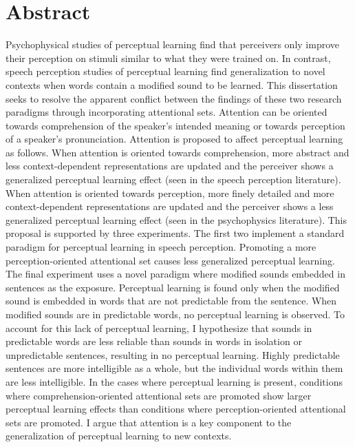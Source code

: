
\chapter{Abstract}

Psychophysical studies of perceptual learning find that perceivers only improve their perception on stimuli similar to what they were trained on.
In contrast, speech perception studies of perceptual learning find generalization to novel contexts when words contain a modified sound to be learned.
This dissertation seeks to resolve the apparent conflict between the findings of these two research paradigms through incorporating attentional sets.
Attention can be oriented towards comprehension of the speaker's intended meaning or towards perception of a speaker's pronunciation.
Attention is proposed to affect perceptual learning as follows.
When attention is oriented towards comprehension, more abstract and less context-dependent representations are updated and the perceiver shows a generalized perceptual learning effect (seen in the speech perception literature).
When attention is oriented towards perception, more finely detailed and more context-dependent representations are updated and the perceiver shows a less generalized perceptual learning effect (seen in the psychophysics literature).
This proposal is supported by three experiments.
The first two implement a standard paradigm for perceptual learning in speech perception.
Promoting a more perception-oriented attentional set causes less generalized perceptual learning.
The final experiment uses a novel paradigm where modified sounds embedded in sentences as the exposure.
Perceptual learning is found only when the modified sound is embedded in words that are not predictable from the sentence.
When modified sounds are in predictable words, no perceptual learning is observed.
To account for this lack of perceptual learning, I hypothesize that sounds in predictable words are less reliable than sounds in words in isolation or unpredictable sentences, resulting in no perceptual learning.
Highly predictable sentences are more intelligible as a whole, but the individual words within them are less intelligible.
In the cases where perceptual learning is present, conditions where comprehension-oriented attentional sets are promoted show larger perceptual learning effects than conditions where perception-oriented attentional sets are promoted.
I argue that attention is a key component to the generalization of perceptual learning to new contexts.


